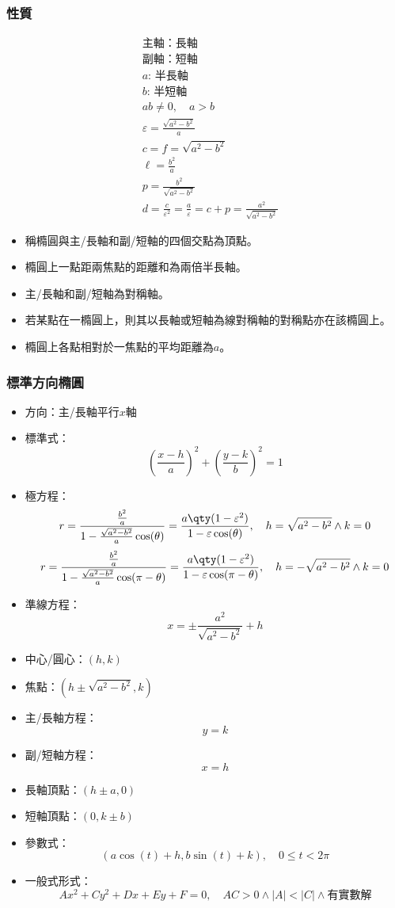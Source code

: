 \documentclass[a4paper,12pt]{article}
\begin{document}
\subsubsection{性質}
\[\begin{aligned}
&\text{主軸：長軸}\\
&\text{副軸：短軸}\\
&a:\,\text{半長軸}\\
&b:\,\text{半短軸}\\
&ab\neq 0,\quad a>b\\
&\varepsilon=\frac{\sqrt{a^2-b^2}}{a}\\
&c=f=\sqrt{a^2-b^2}\\
&\ell=\frac{b^2}{a}\\
&p=\frac{b^2}{\sqrt{a^2-b^2}}\\
&d=\frac{c}{\varepsilon^2}=\frac{a}{\varepsilon}=c+p=\frac{a^2}{\sqrt{a^2-b^2}}
\end{aligned}\]
\begin{itemize}
\item 稱橢圓與主/長軸和副/短軸的四個交點為頂點。
\item 橢圓上一點距兩焦點的距離和為兩倍半長軸。
\item 主/長軸和副/短軸為對稱軸。
\item 若某點在一橢圓上，則其以長軸或短軸為線對稱軸的對稱點亦在該橢圓上。
\item 橢圓上各點相對於一焦點的平均距離為$a$。
\end{itemize}
\subsubsection{標準方向橢圓}
\begin{itemize}
\item 方向：主/長軸平行$x$軸
\item 標準式：
\[\left(\frac{x-h}{a}\right)^2+\left(\frac{y-k}{b}\right)^2=1\]
\item 極方程：
\[r=\frac{\frac{b^2}{a}}{1-\frac{\sqrt{a^2-b^2}}{a}\cos(\theta)}=\frac{a\qty(1-\varepsilon^2)}{1-\varepsilon\cos(\theta)},\quad h=\sqrt{a^2-b^2}\land k=0\]
\[r=\frac{\frac{b^2}{a}}{1-\frac{\sqrt{a^2-b^2}}{a}\cos(\pi-\theta)}=\frac{a\qty(1-\varepsilon^2)}{1-\varepsilon\cos(\pi-\theta)},\quad h=-\sqrt{a^2-b^2}\land k=0\]
\item 準線方程：
\[x=\pm\frac{a^2}{\sqrt{a^2-b^2}}+h\]
\item 中心/圓心：$(h,k)$
\item 焦點：$(h\pm\sqrt{a^2-b^2},k)$
\item 主/長軸方程：
\[y=k\]
\item 副/短軸方程：
\[x=h\]
\item 長軸頂點：$(h\pm a,0)$
\item 短軸頂點：$(0,k\pm b)$
\item 參數式：
\[(a\cos(t)+h,b\sin(t)+k),\quad0\leq t<2\pi\]
\item 一般式形式：
\[Ax^2+Cy^2+Dx+Ey+F=0,\quad AC>0\land |A|<|C|\land\text{有實數解}\]
\end{itemize}
\end{document}
